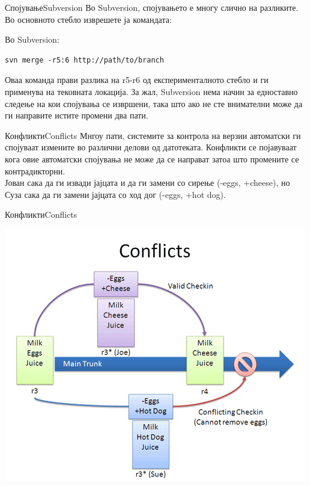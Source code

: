 \begin{frame}[fragile]{Спојување}{Subversion}
Во Subversion, спојувањето е многу слично на разликите. Во основното
стебло изврешете ја командата:
\begin{exampleblock}{Во Subversion:}
\begin{verbatim}
svn merge -r5:6 http://path/to/branch
\end{verbatim}
\end{exampleblock}
\begin{scriptsize}
Оваа команда прави разлика на r5-r6 од експерименталното стебло и ги применува
на тековната локација. За жал, Subversion нема начин за едноставно следење на
кои спојувања се извршени, така што ако не сте внимателни може да ги направите
истите промени два пати.
\end{scriptsize}
\end{frame}


\begin{frame}{Конфликти}{Conflicts}
Мнгоу пати, системите за контрола на верзии автоматски ги спојуваат измените во
различни делови од датотеката. Конфликти се појавуваат кога овие автоматски
спојувања не може да се направат затоа што промените се контрадикторни.\\
Јован сака да ги извади јајцата и да ги замени со сирење (-eggs, +cheese), но
Суза сака да ги замени јајцата со ход дог (-eggs, +hot dog).
\end{frame}

\begin{frame}{Конфликти}{Conflicts}
\begin{center}
    \includegraphics[scale=0.4]{images/vcs_conflict.png}
\end{center}
\end{frame}

